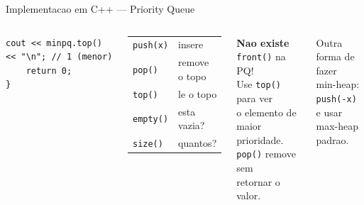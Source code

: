 \documentclass[aspectratio=169,11pt]{beamer}
\begin{document}
\begin{frame}[fragile,shrink=6]{Implementacao em C++ --- Priority Queue}
\begin{columns}[t]
\begin{tcolorbox}[caixaCodigo]
\begin{lstlisting}[style=cppstyle]
    cout << minpq.top() << "\n"; // 1 (menor)
    return 0;
}
        \end{lstlisting}
      \end{tcolorbox}
      \vspace{0.05cm}
      \begin{tcolorbox}[caixaRoxa,title={Operacoes PQ}]
        \footnotesize
        \begin{tabular}{@{}ll@{}}
          \texttt{push(x)}  & insere\\[3pt]
          \texttt{pop()}    & remove o topo\\[3pt]
          \texttt{top()}    & le o topo\\[3pt]
          \texttt{empty()}  & esta vazia?\\[3pt]
          \texttt{size()}   & quantos?\\
        \end{tabular}
      \end{tcolorbox}
      \vspace{0.15cm}
      \begin{tcolorbox}[caixaVermelho,title={Atencao}]
        \footnotesize
        \textbf{Nao existe} \texttt{front()} na PQ!\\[3pt]
        Use \texttt{top()} para ver\\
        o elemento de maior\\
        prioridade.\\[3pt]
        \texttt{pop()} remove sem\\
        retornar o valor.
      \end{tcolorbox}
      \vspace{0.15cm}
      \begin{tcolorbox}[caixaVerde,title={Min-heap trick}]
        \footnotesize
        Outra forma de fazer\\
        min-heap:\\
        \texttt{push(-x)} e usar\\
        max-heap padrao.
      \end{tcolorbox}
  \end{columns}
\end{frame}
\end{document}
